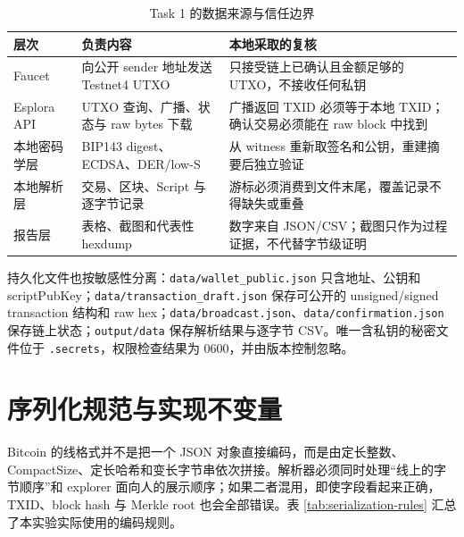 \documentclass[11pt,a4paper,fontset=none]{ctexart}
\begin{document}
\begin{table}[H]
\centering
\caption{Task 1 的数据来源与信任边界}
\label{tab:task1-trust-boundary}
\begin{tabular}{p{}p{}p{}}
\toprule
层次 & 负责内容 & 本地采取的复核 \\
\midrule
Faucet & 向公开 sender 地址发送 Testnet4 UTXO & 只接受链上已确认且金额足够的 UTXO，不接收任何私钥 \\
Esplora API & UTXO 查询、广播、状态与 raw bytes 下载 & 广播返回 TXID 必须等于本地 TXID；确认交易必须能在 raw block 中找到 \\
本地密码学层 & BIP143 digest、ECDSA、DER/low-S & 从 witness 重新取签名和公钥，重建摘要后独立验证 \\
本地解析层 & 交易、区块、Script 与逐字节记录 & 游标必须消费到文件末尾，覆盖记录不得缺失或重叠 \\
报告层 & 表格、截图和代表性 hexdump & 数字来自 JSON/CSV；截图只作为过程证据，不代替字节级证明 \\
\bottomrule
\end{tabular}
\end{table}

持久化文件也按敏感性分离：\texttt{data/wallet\_public.json} 只含地址、公钥和 scriptPubKey；\texttt{data/transaction\_draft.json} 保存可公开的 unsigned/signed transaction 结构和 raw hex；\texttt{data/broadcast.json}、\texttt{data/confirmation.json} 保存链上状态；\texttt{output/data} 保存解析结果与逐字节 CSV。唯一含私钥的秘密文件位于 \texttt{.secrets}，权限检查结果为 0600，并由版本控制忽略。

\section{序列化规范与实现不变量}

Bitcoin 的线格式并不是把一个 JSON 对象直接编码，而是由定长整数、CompactSize、定长哈希和变长字节串依次拼接。解析器必须同时处理“线上的字节顺序”和 explorer 面向人的展示顺序；如果二者混用，即使字段看起来正确，TXID、block hash 与 Merkle root 也会全部错误。表 \ref{tab:serialization-rules} 汇总了本实验实际使用的编码规则。
\end{document}
